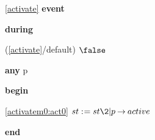 \noindent \ref{activate}  \textbf{event}
\begin{block}
  \item   \textbf{during}
  \begin{block}
  \item[ (\ref{activate}/default) ]{$\false$} %
  \end{block}
  \item   \textbf{any} p
  \item   \textbf{begin}
  \begin{block}
  \item[ \eqref{activatem0:act0} ]{$st \bcmeq st \2| p \fun active $} %
  \end{block}
  \item   \textbf{end} \\
\end{block}
